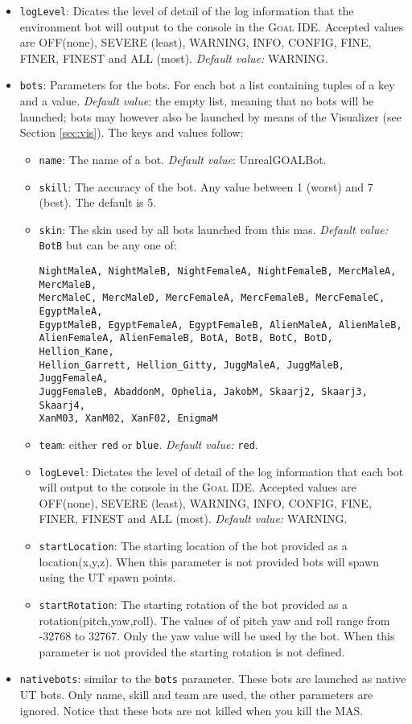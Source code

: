 \documentclass[11pt,a4paper]{article}
\newcommand{\Goal}{\textsc{Goal}}
\begin{document}
\begin{itemize}
	\item \texttt{logLevel}: Dicates the level of detail of the log information that the environment bot will output to the console in the {\Goal} IDE.  Accepted values are \textsc{OFF}(none), \textsc{SEVERE} (least), \textsc{WARNING}, \textsc{INFO}, \textsc{CONFIG}, \textsc{FINE}, \textsc{FINER}, \textsc{FINEST} and \textsc{ALL} (most). \textit{Default value:} \textsc{WARNING}.
	\item \texttt{bots}: Parameters for the bots. For each bot a list containing tuples of a key and a value. \textit{Default value}: the empty list, meaning that no bots will be launched; bots may however also be launched by means of the Visualizer (see Section \ref{sec:vis}). The keys and values follow:
\begin{itemize}
	\item \texttt{name}: The name of a bot. \textit{Default value}: UnrealGOALBot.
	\item \texttt{skill}: The accuracy of the bot. Any value between 1 (worst) and 7 (best). The default is 5.
	\item \texttt{skin}: The skin used by all bots launched from this mas. \textit{Default value:} \texttt{BotB} but can be any one of:
\begin{verbatim}
NightMaleA, NightMaleB, NightFemaleA, NightFemaleB, MercMaleA, MercMaleB,
MercMaleC, MercMaleD, MercFemaleA, MercFemaleB, MercFemaleC, EgyptMaleA,
EgyptMaleB, EgyptFemaleA, EgyptFemaleB, AlienMaleA, AlienMaleB,
AlienFemaleA, AlienFemaleB, BotA, BotB, BotC, BotD, Hellion_Kane,
Hellion_Garrett, Hellion_Gitty, JuggMaleA, JuggMaleB, JuggFemaleA,
JuggFemaleB, AbaddonM, Ophelia, JakobM, Skaarj2, Skaarj3, Skaarj4,
XanM03, XanM02, XanF02, EnigmaM
\end{verbatim}
	\item \texttt{team}: either \texttt{red} or \texttt{blue}. \textit{Default value:} \texttt{red}.
	\item \texttt{logLevel}: Dictates the level of detail of the log information that each bot will output to the console in the {\Goal} IDE.  Accepted values are \textsc{OFF}(none), \textsc{SEVERE} (least), \textsc{WARNING}, \textsc{INFO}, \textsc{CONFIG}, \textsc{FINE}, \textsc{FINER}, \textsc{FINEST} and \textsc{ALL} (most). \textit{Default value:} \textsc{WARNING}.
	\item \texttt{startLocation}: The starting location of the bot provided as a location(x,y,z). When this parameter is not provided bots will spawn using the UT spawn points.
	\item \texttt{startRotation}: The starting rotation of the bot provided as a rotation(pitch,yaw,roll). The values of of pitch yaw and roll range from -32768 to 32767. Only the yaw value will be used by the bot.  When this parameter is not provided the starting rotation is not defined.
\end{itemize}
	
	\item \texttt{nativebots}: similar to the \texttt{bots} parameter. These bots are launched as native UT bots. Only name, skill and team are used, the other parameters are ignored. Notice that these bots are not killed when you kill the MAS.  
\end{itemize}
\end{document}
